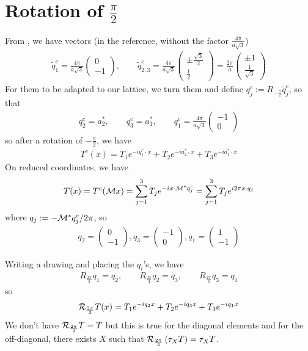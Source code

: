 \documentclass[11pt,a4paper,reqno,french,tikz]{amsart}
\newcommand{\pa}[1]{\left( #1 \right)} %
\newcommand{\f}[2]{\frac{#1}{#2}} %
\newcommand{\mat}[1]{\begin{pmatrix} #1 \end{pmatrix}} %
\begin{document}
\section{Rotation of $\f{\pi}2$}%
\label{sec:rotation_of_q_}

From \cite{BecEmbWitZwo21}, we have vectors (in the reference, without the factor $\f{4\pi}{a\sqrt 3}$)
\begin{align*}
	\widetilde{q}^c_1 = \f{4\pi}{a\sqrt 3} \mat{0 \\ -1}, \qquad \widetilde{q}^c_{2,3} =\f{4\pi}{a\sqrt 3} \mat{\pm \f{\sqrt{3}}2 \\ \f 12}  = \f{2\pi}a \mat{\pm 1 \\ \f{1}{\sqrt 3}}
\end{align*}
For them to be adapted to our lattice, we turn them and define $q^c_j := R_{-\f{\pi}2} \widetilde{q}^c_j$, so that
\begin{align*}
q^c_2 = a_2^*,\qquad q^c_3 = a_1^*,\qquad q^c_1 = \f{4\pi}{a\sqrt 3} \mat{-1 \\ 0}
\end{align*}
so after a rotation of $-\f{\pi}2$, we have
\begin{align*}
T^c(x) = T_1 e^{-i q_1^c \cdot x} + T_2 e^{-i a_2^* \cdot x} + T_3 e^{-i a_1^* \cdot x}
\end{align*}
On reduced coordinates, we have
\begin{align*}
T(x) = T^c(\mathcal{M} x) = \sum_{j=1}^3 T_j e^{-i x \cdot \mathcal{M}^* q^c_j} = \sum_{j=1}^3 T_j e^{i 2\pi x \cdot q_j}
\end{align*}
where $q_j :=  -\mathcal{M}^* q^c_j / 2\pi$, so
\begin{align*}
q_2 = \mat{0 \\ -1}, q_3 = \mat{-1 \\ 0}, q_1 = \mat{1 \\ -1}
\end{align*}

Writing a drawing and placing the $q_i$'s, we have
\begin{align*}
R_{\f{2\pi}3} q_1 = q_2, \qquad R_{\f{2\pi}3} q_2 = q_3, \qquad R_{\f{2\pi}3} q_3 = q_1
\end{align*}
so 
\begin{align*}
\cR_{\f{2\pi}3} T (x) = T_1 e^{-i q_2 x} + T_2 e^{-i q_3 x} + T_3 e^{-iq_1 x}
\end{align*}
We don't have $\cR_{\f{2\pi}3} T = T$ but this is true for the diagonal elements and for the off-diagonal, there exists $X$ such that $\cR_{\f{2\pi}3} \pa{\tau_X T} = \tau_X T$.
\end{document}
